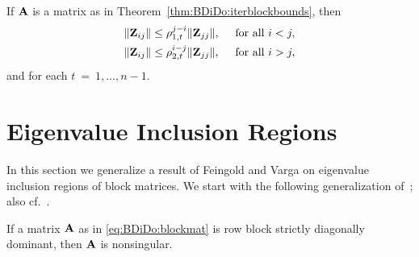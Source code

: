 \begin{cor}\label{cor:BDiDo:decay}
If $\mathbf{A}$ is a matrix as in Theorem~\ref{thm:BDiDo:iterblockbounds}, then
\begin{eqnarray}
\|\mathbf{Z}_{ij}\|\leq\rho_{1,t}^{j-i}\|\mathbf{Z}_{jj}\|,\quad\text{ for all } i<j,\nonumber\\
\|\mathbf{Z}_{ij}\|\leq\rho_{2,t}^{i-j}\|\mathbf{Z}_{jj}\|,\quad\text{ for all } i>j,\nonumber
\end{eqnarray}
and for each $t~=~1,\ldots,n-1$.
\end{cor}

\section{Eigenvalue Inclusion Regions}
\label{BDiDo:Gershgorin}

In this section we generalize a result of Feingold and Varga on eigenvalue
inclusion regions of block matrices. We start with the following generalization
of~\cite[Theorem~1]{FeiVar62}; also cf.~\cite[Theorem~6.2]{Var11}.




\begin{lemma}\label{lem:BDiDo:nonsingular}
If a matrix $\mathbf{A}$ as in \eqref{eq:BDiDo:blockmat} is row block strictly
diagonally dominant, then $\mathbf{A}$ is nonsingular.
\end{lemma}

